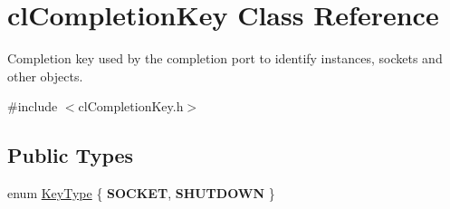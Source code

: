 \hypertarget{classcl_completion_key}{
\section{clCompletionKey Class Reference}
\label{classcl_completion_key}
}


Completion key used by the completion port to identify instances, sockets and other objects.  




{\ttfamily \#include $<$clCompletionKey.h$>$}

\subsection*{Public Types}
\begin{DoxyCompactItemize}
\item 
enum \hyperlink{classcl_completion_key_a3a2147c7a8a50fc3333cee949105ab12}{KeyType} \{ {\bfseries SOCKET}, 
{\bfseries SHUTDOWN}
 \}
\end{DoxyCompactItemize}
